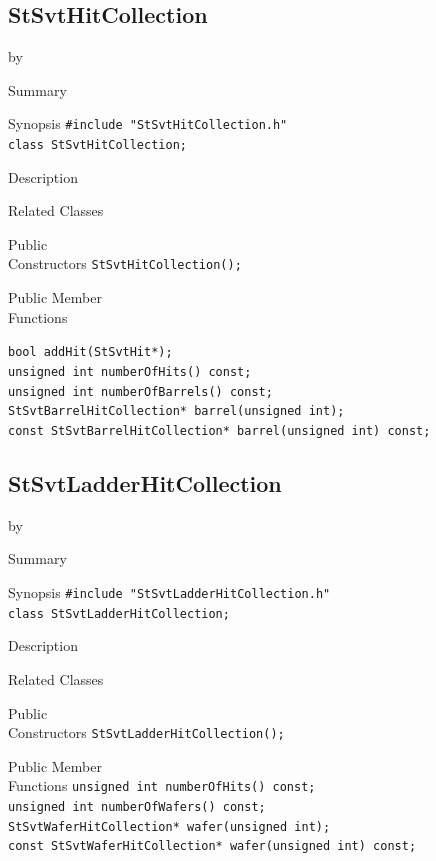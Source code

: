 \documentclass[twoside]{article}
\newcommand{\entrylabel}[1]{\mbox{\textbf{{#1}}}\hfil}%
\newenvironment{entry}
{\begin{list}{}%
    {\renewcommand{\makelabel}{\entrylabel}%
     \setlength{\labelwidth}{90pt}%
     \setlength{\leftmargin}{\labelwidth}
     \advance\leftmargin by \labelsep%
      }%
    }%
  {\end{list}}
\newcommand{\Entrylabel}[1]%
{\raisebox{0pt}[1ex][0pt]{\makebox[\labelwidth][l]%
    {\parbox[t]{\labelwidth}{\hspace{0pt}\textbf{{#1}}}}}}
\newenvironment{Entry}%
{\renewcommand{\entrylabel}{\Entrylabel}\begin{entry}}%
  {\end{entry}}
\begin{document}
\subsection{StSvtHitCollection}
\label{sec:StSvtHitCollection}
\begin{Entry}
\item[Summary]
\item[Synopsis]
    \verb+#include "StSvtHitCollection.h"+\\
    \verb+class StSvtHitCollection;+\\
\item[Description]
\item[Related Classes]
\item[Public\\ Constructors]
    \verb+StSvtHitCollection();+\\
\item[Public Member\\ Functions]

    \verb+bool addHit(StSvtHit*);+\\

    \verb+unsigned int numberOfHits() const;+\\

    \verb+unsigned int numberOfBarrels() const;+\\
    
    \verb+StSvtBarrelHitCollection* barrel(unsigned int);+\\
    \verb+const StSvtBarrelHitCollection* barrel(unsigned int) const;+\\
\end{Entry}
\clearpage


\subsection{StSvtLadderHitCollection}
\label{sec:StSvtLadderHitCollection}
\begin{Entry}
\item[Summary]
\item[Synopsis]
    \verb+#include "StSvtLadderHitCollection.h"+\\
    \verb+class StSvtLadderHitCollection;+\\
\item[Description]
\item[Related Classes]
\item[Public\\ Constructors]
    \verb+StSvtLadderHitCollection();+\\
\item[Public Member\\ Functions]
    \verb+unsigned int numberOfHits() const;+\\
    \verb+unsigned int numberOfWafers() const;+\\
    \verb+StSvtWaferHitCollection* wafer(unsigned int);+\\
    \verb+const StSvtWaferHitCollection* wafer(unsigned int) const;+\\
\end{Entry}
\clearpage
\end{document}
